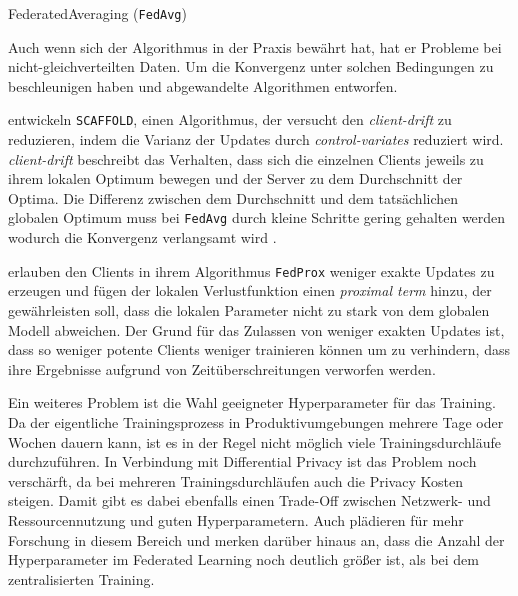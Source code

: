 \begin{algorithm}[tb]
	\caption{FederatedAveraging (\texttt{FedAvg})}
	\label{alg:fedavg}
\end{algorithm}

Auch wenn sich der Algorithmus in der Praxis bewährt hat\cite{hard:2018, ramaswamy:2020}, hat er Probleme bei nicht-gleichverteilten Daten. Um die Konvergenz unter solchen Bedingungen zu beschleunigen haben \textcite{karimireddy:2020} und \textcite{li:2020} abgewandelte Algorithmen entworfen.

\textcite{karimireddy:2020} entwickeln \texttt{SCAFFOLD}, einen Algorithmus, der versucht den \textit{client-drift} zu reduzieren, indem die Varianz der Updates durch \textit{control-variates} reduziert wird. \textit{client-drift} beschreibt das Verhalten, dass sich die einzelnen Clients jeweils zu ihrem lokalen Optimum bewegen und der Server zu dem Durchschnitt der Optima. Die Differenz zwischen dem Durchschnitt und dem tatsächlichen globalen Optimum muss bei \texttt{FedAvg} durch kleine Schritte gering gehalten werden wodurch die Konvergenz verlangsamt wird \parencite[p.4]{karimireddy:2020}.

\textcite{li:2020} erlauben den Clients in ihrem Algorithmus \texttt{FedProx} weniger exakte Updates zu erzeugen und fügen der lokalen Verlustfunktion einen \textit{proximal term} hinzu, der gewährleisten soll, dass die lokalen Parameter nicht zu stark von dem globalen Modell abweichen. Der Grund für das Zulassen von weniger exakten Updates ist, dass so weniger potente Clients weniger trainieren können um zu verhindern, dass ihre Ergebnisse aufgrund von Zeitüberschreitungen verworfen werden.

Ein weiteres Problem ist die Wahl geeigneter Hyperparameter für das Training. Da der eigentliche Trainingsprozess in Produktivumgebungen mehrere Tage\cite[p.5]{hard:2018} oder Wochen\cite[p.4]{ramaswamy:2020} dauern kann, ist es in der Regel nicht möglich viele Trainingsdurchläufe durchzuführen. In Verbindung mit Differential Privacy ist das Problem noch verschärft, da bei mehreren Trainingsdurchläufen auch die Privacy Kosten steigen. Damit gibt es dabei ebenfalls einen Trade-Off zwischen Netzwerk- und Ressourcennutzung und guten Hyperparametern. Auch \textcite[p.31]{kairouz:2021} plädieren für mehr Forschung in diesem Bereich und merken darüber hinaus an, dass die Anzahl der Hyperparameter im Federated Learning noch deutlich größer ist, als bei dem zentralisierten Training.

